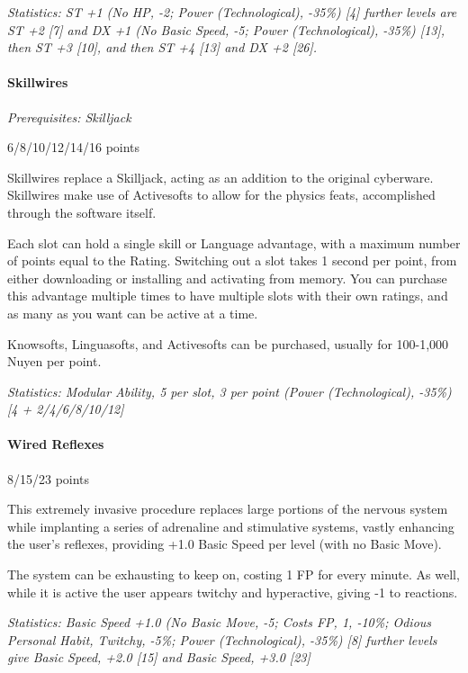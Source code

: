 \begin{multicols*}{3}
	\textit{\textcolor{OliveGreen}{Statistics: ST +1 (No HP, -2; Power (Technological), -35\%) [4] further levels are ST +2 [7] and DX +1 (No Basic Speed, -5; Power (Technological), -35\%) [13], then ST +3 [10], and then ST +4 [13] and DX +2 [26].}}
	
	\paragraph{Skillwires}
	\textit{Prerequisites: Skilljack}
	\begin{flushright}
		6/8/10/12/14/16 points
	\end{flushright}
	
	Skillwires replace a Skilljack, acting as an addition to the original cyberware. Skillwires make use of Activesofts to allow for the physics feats, accomplished through the software itself. 
	
	Each slot can hold a single skill or Language advantage, with a maximum number of points equal to the Rating. Switching out a slot takes 1 second per point, from either downloading or installing and activating from memory. You can purchase this advantage multiple times to have multiple slots with their own ratings, and as many as you want can be active at a time.
	
	Knowsofts, Linguasofts, and Activesofts can be purchased, usually for 100-1,000 Nuyen per point.
	
	\textit{\textcolor{OliveGreen}{Statistics: Modular Ability, 5 per slot, 3 per point (Power (Technological), -35\%)[4 + 2/4/6/8/10/12]}}
	
	\paragraph{Wired Reflexes}
	\begin{flushright}
		8/15/23 points
	\end{flushright}
	
	This extremely invasive procedure replaces large portions of the nervous system while implanting a series of adrenaline and stimulative systems, vastly enhancing the user's reflexes, providing +1.0 Basic Speed per level (with no Basic Move).
	
	The system can be exhausting to keep on, costing 1 FP for every minute. As well, while it is active the user appears twitchy and hyperactive, giving -1 to reactions.
	
	\textit{\textcolor{OliveGreen}{Statistics: Basic Speed +1.0 (No Basic Move, -5; Costs FP, 1, -10\%; Odious Personal Habit, Twitchy, -5\%; Power (Technological), -35\%) [8] further levels give Basic Speed, +2.0 [15] and Basic Speed, +3.0 [23]}}
	

\end{multicols*}
